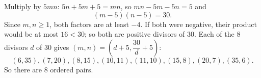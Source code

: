 Multiply by $5mn$: $5n+5m+5=mn$, so $mn-5m-5n=5$ and
\[
(m-5)(n-5)=30 .
\]
Since $m,n\ge1$, both factors are at least $-4$. If both were negative, their product would be at most $16<30$; so both are positive divisors of $30$. Each of the $8$ divisors $d$ of $30$ gives $(m,n)=(d+5,\dfrac{30}{d}+5)$:
\[
(6,35),(7,20),(8,15),(10,11),(11,10),(15,8),(20,7),(35,6).
\]
So there are $\boxed{8}$ ordered pairs.
